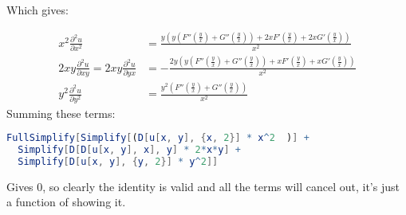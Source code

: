 \documentclass[class=article, crop=false]{standalone}
\begin{document}
Which gives:

$$
\begin{aligned}
x^2 \frac{\partial^2 u }{\partial x^2} &= \frac{y \left(y \left(F''\left(\frac{y}{x}\right)+G''\left(\frac{y}{x}\right)\right)+2 x F'\left(\frac{y}{x}\right)+2 x G'\left(\frac{y}{x}\right)\right)}{x^2} \\
2xy \frac{\partial^2 u }{\partial xy} = 2xy \frac{\partial^2 u }{\partial yx} &=   -\frac{2 y \left(y \left(F''\left(\frac{y}{x}\right)+G''\left(\frac{y}{x}\right)\right)+x F'\left(\frac{y}{x}\right)+x G'\left(\frac{y}{x}\right)\right)}{x^2}\\
y^2 \frac{\partial^2 u }{\partial y^2} &= \frac{y^2 \left(F''\left(\frac{y}{x}\right)+G''\left(\frac{y}{x}\right)\right)}{x^2}
\end{aligned}
$$
Summing these terms: 

\begin{lstlisting}[language = Mathematica]
FullSimplify[Simplify[(D[u[x, y], {x, 2}] * x^2  )] +
  Simplify[D[D[u[x, y], x], y] * 2*x*y] +
  Simplify[D[u[x, y], {y, 2}] * y^2]]
\end{lstlisting}	

Gives $0$, so clearly the identity is valid and all the terms will cancel out, it's just a function of showing it.








 
\end{document}
